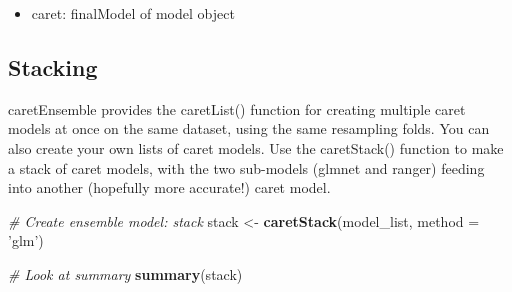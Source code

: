 \documentclass[]{book}
\newenvironment{Shaded}{\begin{snugshade}}{\end{snugshade}}
\newcommand{\KeywordTok}[1]{\textcolor[rgb]{0.13,0.29,0.53}{\textbf{#1}}}
\newcommand{\DataTypeTok}[1]{\textcolor[rgb]{0.13,0.29,0.53}{#1}}
\newcommand{\StringTok}[1]{\textcolor[rgb]{0.31,0.60,0.02}{#1}}
\newcommand{\CommentTok}[1]{\textcolor[rgb]{0.56,0.35,0.01}{\textit{#1}}}
\newcommand{\OtherTok}[1]{\textcolor[rgb]{0.56,0.35,0.01}{#1}}
\newcommand{\OperatorTok}[1]{\textcolor[rgb]{0.81,0.36,0.00}{\textbf{#1}}}
\newcommand{\NormalTok}[1]{#1}
\providecommand{\tightlist}{%
  \setlength{\itemsep}{0pt}\setlength{\parskip}{0pt}}
\theoremstyle{definition}
\theoremstyle{definition}
\theoremstyle{definition}
\theoremstyle{remark}
\begin{document}
\begin{Shaded}
\end{Shaded}

\begin{itemize}
\tightlist
\item
  caret: finalModel of model object
\end{itemize}

\subsection{Stacking}\label{stacking}

caretEnsemble provides the caretList() function for creating multiple
caret models at once on the same dataset, using the same resampling
folds. You can also create your own lists of caret models. Use the
caretStack() function to make a stack of caret models, with the two
sub-models (glmnet and ranger) feeding into another (hopefully more
accurate!) caret model.

\begin{Shaded}
\begin{Highlighting}[]
\CommentTok{# Create ensemble model: stack}
\NormalTok{stack <-}\StringTok{ }\KeywordTok{caretStack}\NormalTok{(model_list, }\DataTypeTok{method =} \StringTok{'glm'}\NormalTok{)}

\CommentTok{# Look at summary}
\KeywordTok{summary}\NormalTok{(stack)}
\end{Highlighting}
\end{Shaded}
\end{document}
